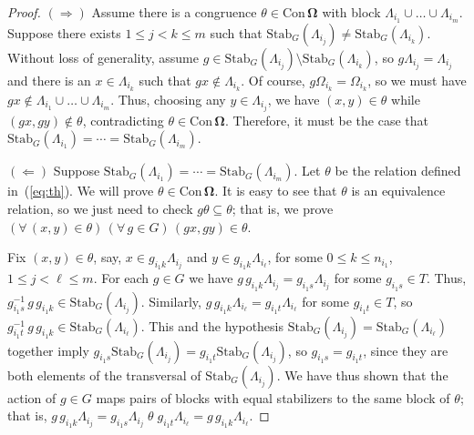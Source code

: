 \documentclass[cm,dissertation]{uhthesis}
\theoremstyle{plain}
\theoremstyle{definition}
\theoremstyle{remark}
\numberwithin{theorem}{section}
\numberwithin{claim}{chapter}
\numberwithin{equation}{section}
\numberwithin{conjecture}{chapter}
\newcommand{\<}{\ensuremath{\langle}}
\renewcommand{\>}{\ensuremath{\rangle}}
\renewcommand{\leq}{\ensuremath{\leqslant}}
\newcommand{\Stab}{\ensuremath{\mathrm{Stab}}}
\newcommand{\Con}{\ensuremath{\mathrm{Con\,}}}
\newcommand{\0}{\ensuremath{\mathbf{0}}}
\newcommand{\1}{\ensuremath{\mathbf{1}}}
\newcommand{\2}{\ensuremath{\mathbf{2}}}
\newcommand{\3}{\ensuremath{\mathbf{3}}}
\newcommand{\4}{\ensuremath{\mathbf{4}}}
\newcommand{\5}{\ensuremath{\mathbf{5}}}
\newcommand{\bOmega}{\ensuremath{\alg \Omega}}
\newcommand{\ConO}{\ensuremath{\Con \bOmega}}
\newcommand{\alg}[1]{\mathbf{#1}}
\begin{document}
\begin{proof}
$(\Rightarrow)$  Assume there is a congruence $\theta \in \ConO$ with block 
$\Lambda_{i_1} \cup \dots  \cup \Lambda_{i_m}$.  
Suppose there exists $1\leq j < k \leq m$ such that 
$\Stab_G(\Lambda_{i_j}) \neq \Stab_G(\Lambda_{i_k})$.  Without loss of generality, assume 
$g\in \Stab_G(\Lambda_{i_j}) \setminus \Stab_G(\Lambda_{i_k})$, so $g \Lambda_{i_j} = \Lambda_{i_j}$ and
there is an $x\in \Lambda_{i_k}$ such that $g x \notin \Lambda_{i_k}$.  Of course, 
$g \Omega_{i_k} = \Omega_{i_k}$, so we must have
$g x \notin \Lambda_{i_1} \cup \dots  \cup \Lambda_{i_m}$.  Thus, choosing any $y\in
\Lambda_{i_j}$, we have $(x,y)\in \theta$ while 
$(g x, g y)\notin \theta$, contradicting $\theta \in \ConO$.  Therefore, it must be
the case that 
$\Stab_G(\Lambda_{i_1}) = \cdots = \Stab_G(\Lambda_{i_m})$.

\medskip

\noindent $(\Leftarrow)$  
Suppose $\Stab_G(\Lambda_{i_1}) = \cdots = \Stab_G(\Lambda_{i_m})$.
Let $\theta$ be the relation defined in~(\ref{eq:th}).  We will prove $\theta \in
\ConO$.  It is easy to see that $\theta$ is an equivalence relation, so we
just need to check $g \theta \subseteq \theta$; that is, we prove
$(\forall \, (x,y)\in \theta)\, (\forall \, g\in G) \,
(gx ,gy)\in \theta$.

Fix $(x,y)\in \theta$, say, 
$x\in g_{i_1 k}\Lambda_{i_j}$ and 
$y\in g_{i_1 k}\Lambda_{i_\ell}$, 
for some $0 \leq k \leq n_{i_1}$,
$1\leq j < \ell \leq m$.  
For each $g\in G$ we have 
$g\, g_{i_1 k}\Lambda_{i_j} = g_{i_1 s}\Lambda_{i_j}$
for some $g_{i_1 s}\in T$.
Thus, $g_{i_1 s}^{-1} \, g\, g_{i_1 k} \in \Stab_G(\Lambda_{i_j})$.
Similarly, $g\, g_{i_1 k}\Lambda_{i_\ell} = g_{i_1 t}\Lambda_{i_\ell}$
for some $g_{i_1 t}\in T$, so
$g_{i_1 t}^{-1}\, g \, g_{i_1 k} \in
\Stab_G(\Lambda_{i_\ell})$.
This and the hypothesis $\Stab_G(\Lambda_{i_j}) = \Stab_G(\Lambda_{i_\ell})$ together imply
$g_{i_1 s}\Stab_G(\Lambda_{i_j}) = g_{i_1 t}\Stab_G(\Lambda_{i_j})$, 
so $g_{i_1 s} = g_{i_1 t}$, since they are both elements of the transversal of
$\Stab_G(\Lambda_{i_j})$.   We have thus shown that the action of $g\in G$ 
maps pairs of blocks with equal stabilizers to the same block of $\theta$; that is, 
$g \, g_{i_1 k}\Lambda_{i_j} = g_{i_1 s}\Lambda_{i_j}  \; \theta \;
g_{i_1 t} \Lambda_{i_\ell} = g \, g_{i_1 k}\Lambda_{i_\ell}$.
\end{proof}

\end{document}
